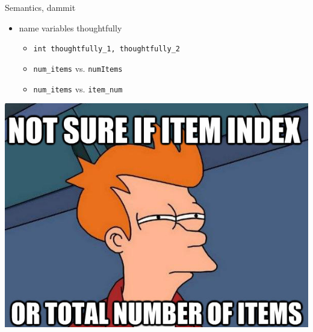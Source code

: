 \documentclass{beamer}
\begin{document}
\begin{frame}{Semantics, dammit}
  \begin{itemize}
    \pause
    \item name variables thoughtfully
    \pause
    \begin{itemize}
      \item \texttt{int thoughtfully\_1, thoughtfully\_2}
      \pause
      \item \texttt{num\_items} vs. \texttt{numItems}
      \pause
      \item \texttt{num\_items} vs. \texttt{item\_num}
    \end{itemize}
    \pause
  \end{itemize}
  \begin{center}
    \includegraphics[scale=0.3]{img/fry}
  \end{center}
\end{frame}
\end{document}
